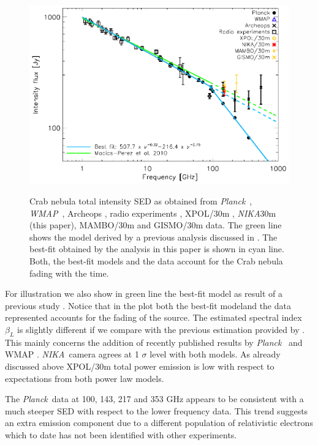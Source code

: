 \documentclass[twocolumn,traditabstract]{aa}
\def\NIKA{\textit{NIKA}}
\def\Planck{\textit{Planck}}
\def\WMAP{\textit{WMAP}}
\begin{document}
\begin{figure}
  \centering
          { \includegraphics[width=1\linewidth,keepaspectratio]{figures/Crab_SED_int_test.pdf}}
           \caption{Crab nebula total intensity SED as obtained from \Planck\ \citep{2015arXiv150702058P}, \WMAP\ \citep{2011ApJS..192...19W}, Archeops \citep{macias2007archeops}, radio experiments \citep{dmitrenko1970absolute, 1971IzVUZ..14..157V}, XPOL/30m \citep{aumont2010}, \NIKA\/30m (this paper), MAMBO/30m \citep{2002A&A...386.1044B} and GISMO/30m \citep{2011ApJ...734...54A} data. The green line shows the model derived by a previous analysis discussed in \citep{macias2010}. The best-fit obtained by the analysis in this paper is shown in cyan line. Both, the best-fit models and the data account for the Crab nebula fading with the time.}
\label{crab_SED}		
  \end{figure} 

For illustration we also show in green line the best-fit model as result of a previous study \citet{macias2010}. 
Notice that in the plot both the best-fit modeland the data represented accounts for the fading of the source.
The estimated spectral index $\beta_L$ is slightly different if we compare with the previous estimation provided by \cite{macias2010}. This mainly concerns the addition of recently published results by \Planck\ \citep{2015arXiv150702058P} and  WMAP \citep{2011ApJS..192...19W}.
\NIKA\ camera agrees at 1 $\sigma$ level with both models. 
As already discussed above XPOL/30m total power emission is low with respect to expectations from both power law models.
 
The \Planck\ data at 100, 143, 217 and 353 GHz appears to be consistent with a much steeper SED with respect to the lower frequency data. This trend suggests  an extra emission component due to a different
population of relativistic electrons \citep{1965ARA&A...3..297G, 2012ApJ...760...96G} which to date has not been identified with other experiments. 
\end{document}

